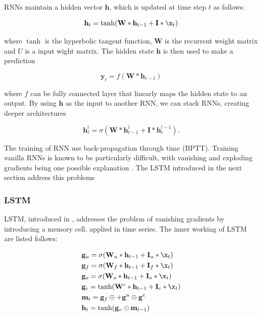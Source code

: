 \documentclass[5p]{elsarticle}
\begin{document}
RNNs maintain a hidden vector $\mathbf h$, which is updated at time step $t$ as follows:

\begin{equation}
	\mathbf h_t = \tanh(\mathbf W * \mathbf h_{t-1} + \mathbf I * \x_t)
\end{equation}

where $\tanh$ is the hyperbolic tangent function, $\mathbf W$ is the recurrent weight matrix and $U$ is a input wight matrix. The hidden state $\mathbf h$ is then used to make a prediction

\begin{equation}
	\mathbf y_t = f(\mathbf W * \mathbf h_{t-1})
\end{equation}

where $f$ can be fully connected layer that linearly maps the hidden state to an output. By using $\mathbf h$ as the input to another RNN, we can stack RNNs, creating deeper architectures 

\begin{equation}
	\mathbf h_t^{l} = \sigma(\mathbf W * \mathbf h_{t-1}^{l} + \mathbf I * \mathbf h_t^{l-1}).
\end{equation}

The training of RNN use back-propagation through time (BPTT). Training vanilla RNNs is known to be particularly difficult, with vanishing and exploding gradients being one possible explanation \cite{pascanu2012difficulty}. The LSTM introduced in the next section address this problems

\subsubsection{LSTM}
LSTM, introduced in \cite{Hochreiter1997LongMemory}, addresses the problem of vanishing gradients by introducing a memory cell. \cite{MalhotraLongSeries} applied in time series. The inner working of LSTM are listed follows:

\begin{equation}
	\begin{split}
		& \mathbf g_u = \sigma(\mathbf W_u * \mathbf h_{t-1} + \mathbf I_u * \x_t) \\
		& \mathbf g_f = \sigma(\mathbf W_f * \mathbf h_{t-1} + \mathbf I_f * \x_t) \\
		& \mathbf g_o = \sigma(\mathbf W_o * \mathbf h_{t-1} + \mathbf I_o * \x_t) \\
		& \mathbf g_c = \tanh(\mathbf W^c * \mathbf h_{t-1} + \mathbf I_c * \x_t) \\
		& \mathbf m_t = \mathbf g_f \odot \mathbf +  \mathbf g^u \odot \mathbf g^c \\
		& \mathbf h_t = \tanh(\mathbf g_o \odot \mathbf m_{t-1}) 
	\end{split}
\end{equation}
\end{document}
